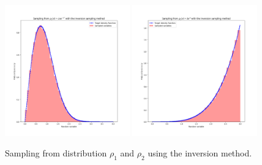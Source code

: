 \begin{figure}[t!]
\centering
\includegraphics[width=0.48\textwidth]{FIG/exercise_1_images/Figure_1.png}
\hfill
\includegraphics[width=0.48\textwidth]{FIG/exercise_1_images/Figure_2.png}
\caption{Sampling from distribution $\rho_1$ and $\rho_2$ using the inversion method.}
\label{fig:combined_figure}
\end{figure}